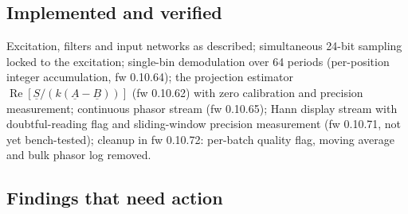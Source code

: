 \documentclass[11pt,a4paper]{article}
\begin{document}
\subsection{Implemented and verified}

Excitation, filters and input networks as described; simultaneous 24-bit
sampling locked to the excitation; single-bin demodulation over 64 periods
(per-position integer accumulation, fw 0.10.64); the projection estimator
$\operatorname{Re}[\underline{S}/(k(\underline{A}-\underline{B}))]$ (fw 0.10.62)
with zero calibration and precision
measurement; continuous phasor stream (fw 0.10.65); Hann display stream with doubtful-reading flag and
sliding-window precision measurement (fw 0.10.71, not yet bench-tested);
cleanup in fw 0.10.72: per-batch quality flag, moving average and bulk phasor log removed.

\subsection{Findings that need action}
\end{document}
